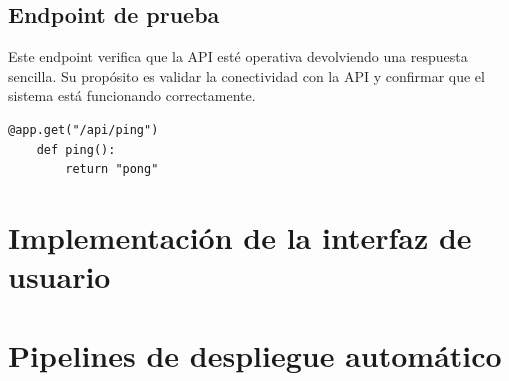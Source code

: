 \subsection{Endpoint de prueba}

Este endpoint verifica que la API esté operativa devolviendo una respuesta sencilla. Su propósito es 
validar la conectividad con la API y confirmar que el sistema está funcionando correctamente.

\begin{lstlisting}[label=cod:api-4,caption=Endpoint de prueba.]
	@app.get("/api/ping")
	def ping():
		return "pong"
\end{lstlisting}

\section{Implementación de la interfaz de usuario}

\section{Pipelines de despliegue automático}